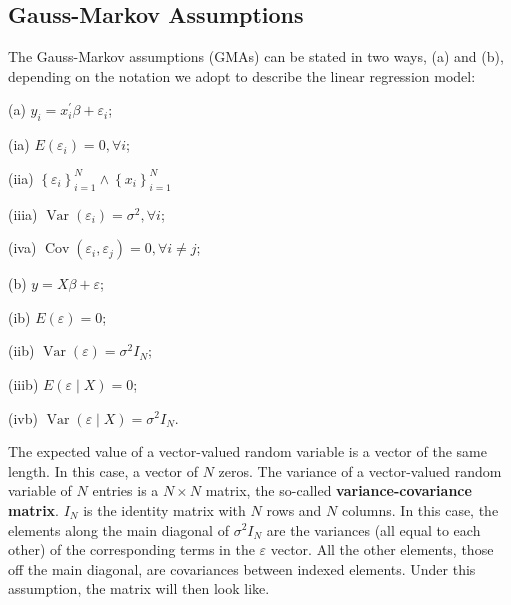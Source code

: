 \subsection{Gauss-Markov Assumptions}
The Gauss-Markov assumptions (GMAs) can be stated in two ways, (a) and (b), depending on the notation we adopt to describe the linear regression model:
\\
\begin{itemize}
    \begin{minipage}[t]{0.5\textwidth}
        \item[(a)] $y_{i}=x_{i}^{\prime} \beta+\varepsilon_{i}$;
        \item[(ia)] $E\left(\varepsilon_{i}\right)=0, \forall i$;
        \item[(iia)] $\left\{\varepsilon_{i}\right\}_{i=1}^{N} \wedge\left\{x_{i}\right\}_{i=1}^{N}$
        \item[(iiia)] $\operatorname{Var}\left(\varepsilon_{i}\right)=\sigma^{2}, \forall i$;
        \item[(iva)] $\operatorname{Cov}\left(\varepsilon_{i}, \varepsilon_{j}\right)=0, \forall i \neq j$;
    \end{minipage}
    \begin{minipage}[t]{0.5\textwidth}
        \item[(b)] $y=X \beta+\varepsilon$;
        \item[(ib)] $E(\varepsilon)=0$;
        \item[(iib)] $\operatorname{Var}(\varepsilon)=\sigma^{2} I_{N}$;
        \item[(iiib)] $E(\varepsilon \mid X)=0$;
        \item[(ivb)] $\operatorname{Var}(\varepsilon \mid X)=\sigma^{2} I_{N}$. 
    \end{minipage}
\end{itemize}    

The expected value of a vector-valued random variable is a vector of the same length. In this case, a vector of $N$ zeros. The variance of a vector-valued random variable of $N$ entries is a $N \times N$ matrix, the so-called \textbf{variance-covariance matrix}. $I_{N}$ is the identity matrix with $N$ rows and $N$ columns. In this case, the elements along the main diagonal of $\sigma^{2} I_{N}$ are the variances (all equal to each other) of the corresponding terms in the $\varepsilon$ vector. All the other elements, those off the main diagonal, are covariances between indexed elements. Under this assumption, the matrix will then look like.

